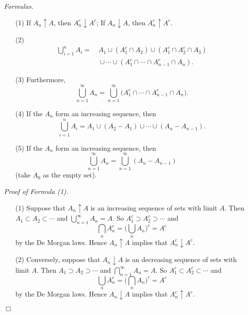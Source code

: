 \documentclass{article}
\begin{document}
\emph{Formulas.}
\begin{enumerate}
\item[(1)]
  If $A_n \uparrow A$, then $A_n^{c} \downarrow A^{c}$;
  If $A_n \downarrow A$, then $A_n^{c} \uparrow A^{c}$.

\item[(2)]
  \begin{align*}
    \bigcup_{i=1}^{n} A_i =
    & \:
      A_1
      \cup (A_1^{c} \cap A_2)
      \cup (A_1^{c} \cap A_2^{c} \cap A_3) \\
    & \:
      \cup \cdots \cup (A_1^{c} \cap \cdots \cap A_{n-1}^{c} \cap A_n).
  \end{align*}

\item[(3)]
  Furthermore,
  \[
    \bigcup_{n=1}^{\infty} A_n
    = \bigcup_{n=1}^{\infty} \bigg( A_1^{c} \cap \cdots \cap A_{n-1}^{c} \cap A_n \bigg).
  \]

\item[(4)]
  If the $A_n$ form an increasing sequence, then
  \[
    \bigcup_{i=1}^{n} A_i
    = A_1 \cup (A_2 - A_1) \cup \cdots \cup (A_n - A_{n-1}).
  \]

\item[(5)]
  If the $A_n$ form an increasing sequence, then
  \[
    \bigcup_{n=1}^{\infty} A_n
    = \bigcup_{n=1}^{\infty} (A_n - A_{n-1})
  \]
  (take $A_0$ as the empty set). \\
\end{enumerate}



\emph{Proof of Formula (1).}
\begin{enumerate}
\item[(1)]
  Suppose that $A_n \uparrow A$ is an increasing sequence of sets with limit $A$.
  Then $A_1 \subset A_2 \subset \cdots$ and $\bigcup_{n=1}^{\infty} A_n = A$.
  So $A_1^{c} \supset A_2^{c} \supset \cdots$ and
  \[
    \bigcap_{n} A_n^{c}
    = \bigg( \bigcup_{n} A_n \bigg)^{c} = A^{c}
  \]
  by the De Morgan laws.
  Hence $A_n \uparrow A$ implies that $A_n^{c} \downarrow A^{c}$.

\item[(2)]
  Conversely, suppose that $A_n \downarrow A$ is an decreasing sequence of sets with limit $A$.
  Then $A_1 \supset A_2 \supset \cdots$ and $\bigcap_{n=1}^{\infty} A_n = A$.
  So $A_1^{c} \subset A_2^{c} \subset \cdots$ and
  \[
    \bigcup_{n} A_n^{c}
    = \bigg( \bigcap_{n} A_n \bigg)^{c} = A^{c}
  \]
  by the De Morgan laws.
  Hence $A_n \downarrow A$ implies that $A_n^{c} \uparrow A^{c}$.
\end{enumerate}
$\Box$ \\\\
\end{document}
